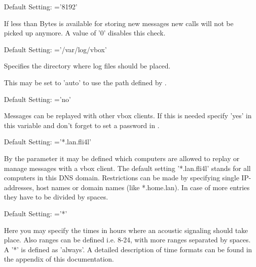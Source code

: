 \begin{description}
    Default Setting: ='8192'

    If less than  Bytes is available for storing new messages
    new calls will not be picked up anymore. A value of '0' disables this check.
 

    Default Setting: ='/var/log/vbox'

    Specifies the directory where log files should be placed.

    This may be set to 'auto' to use the path defined by .


    Default Setting: ='no'
    
    Messages can be replayed with other vbox clients. If this is needed specify
    'yes' in this variable and don't forget to set a password in
    .
    


    Default Setting: ='*.lan.fli4l'
    
    By the parameter  it may be defined which computers are allowed
    to replay or manage messages with a vbox client. The default setting '*.lan.fli4l'
    stands for all computers in this DNS domain. Restrictions can be made by specifying
    single IP-addresses, host names or domain names (like *.home.lan). In case of more
    entries they have to be divided by spaces.
    



    Default Setting: ='*'
    
    Here you may specify the times in hours where an acoustic signaling should take place.
    Also ranges can be defined i.e. 8-24, with more ranges separated by spaces. A '*' is
    defined as 'always'. A detailed description of time formats can be found in the
    appendix of this documentation.
    

\end{description}
